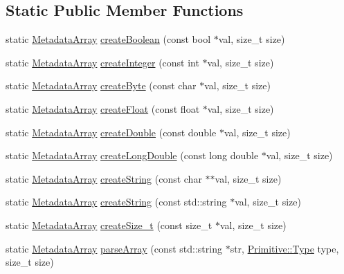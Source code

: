 \subsection*{Static Public Member Functions}
\begin{DoxyCompactItemize}
\item 
static \hyperlink{classBUSBOY_1_1MetadataArray}{MetadataArray} \hyperlink{classBUSBOY_1_1MetadataArray_af8a7f889077a71340a0c270aa0a8ca09}{createBoolean} (const bool $\ast$val, size\_\-t size)
\item 
static \hyperlink{classBUSBOY_1_1MetadataArray}{MetadataArray} \hyperlink{classBUSBOY_1_1MetadataArray_a0a2f1689131a0393e438d31c8aa16f52}{createInteger} (const int $\ast$val, size\_\-t size)
\item 
static \hyperlink{classBUSBOY_1_1MetadataArray}{MetadataArray} \hyperlink{classBUSBOY_1_1MetadataArray_a74ecc4d8b773e91bf2c869131d981448}{createByte} (const char $\ast$val, size\_\-t size)
\item 
static \hyperlink{classBUSBOY_1_1MetadataArray}{MetadataArray} \hyperlink{classBUSBOY_1_1MetadataArray_a15cec39e2fe2bbd4954c918b4f5c4b86}{createFloat} (const float $\ast$val, size\_\-t size)
\item 
static \hyperlink{classBUSBOY_1_1MetadataArray}{MetadataArray} \hyperlink{classBUSBOY_1_1MetadataArray_a4703f8e6898cd711ddec3b0c2a18abfc}{createDouble} (const double $\ast$val, size\_\-t size)
\item 
static \hyperlink{classBUSBOY_1_1MetadataArray}{MetadataArray} \hyperlink{classBUSBOY_1_1MetadataArray_a8597b20cc58014bd57c5bfae63c12e4c}{createLongDouble} (const long double $\ast$val, size\_\-t size)
\item 
static \hyperlink{classBUSBOY_1_1MetadataArray}{MetadataArray} \hyperlink{classBUSBOY_1_1MetadataArray_af8cf9e28152c4a5333dcaf707d7a6a19}{createString} (const char $\ast$$\ast$val, size\_\-t size)
\item 
static \hyperlink{classBUSBOY_1_1MetadataArray}{MetadataArray} \hyperlink{classBUSBOY_1_1MetadataArray_a14a666ffeef5adfb90f117b02c5a5646}{createString} (const std::string $\ast$val, size\_\-t size)
\item 
static \hyperlink{classBUSBOY_1_1MetadataArray}{MetadataArray} \hyperlink{classBUSBOY_1_1MetadataArray_a5215e46b13859c6f7efef8536f76d6ad}{createSize\_\-t} (const size\_\-t $\ast$val, size\_\-t size)
\item 
static \hyperlink{classBUSBOY_1_1MetadataArray}{MetadataArray} \hyperlink{classBUSBOY_1_1MetadataArray_ad17ba74b33150b8783c5ef7c0f66c05a}{parseArray} (const std::string $\ast$str, \hyperlink{classBUSBOY_1_1Primitive_afa08dc3cc68d2e851adafb0fc492cf15}{Primitive::Type} type, size\_\-t size)
$$
\end{DoxyCompactItemize}
